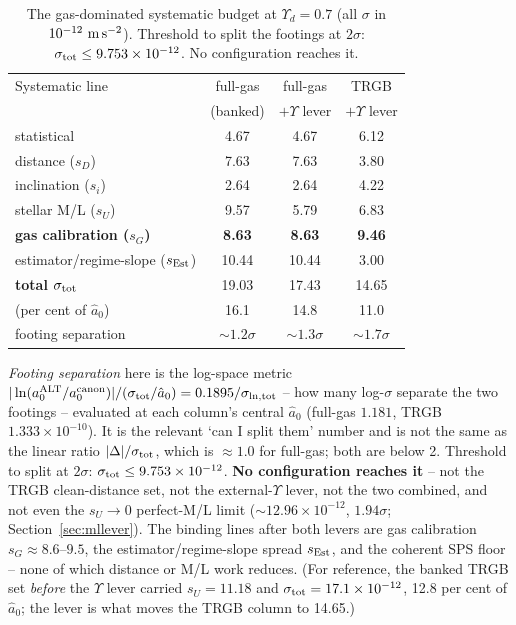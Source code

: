 \documentclass[fleqn,usenatbib]{mnras}
\begin{document}
\begin{table}
\centering
\caption{The gas-dominated systematic budget at $\Upsilon_d=0.7$ (all $\sigma$ in $10^{-12}\ {\rm m\,s^{-2}}$). Threshold to split the footings at $2\sigma$: $\sigma_{\rm tot}\le9.753\times10^{-12}$. No configuration reaches it.}
\label{tab:budget}
\setlength{\tabcolsep}{3.5pt}
\begin{tabular}{lccc}
\hline
Systematic line & full-gas & full-gas & TRGB \\
 & (banked) & $+\Upsilon$ lever & $+\Upsilon$ lever \\
\hline
statistical & 4.67 & 4.67 & 6.12 \\
distance ($s_D$) & 7.63 & 7.63 & 3.80 \\
inclination ($s_i$) & 2.64 & 2.64 & 4.22 \\
stellar M/L ($s_U$) & 9.57 & 5.79 & 6.83 \\
\textbf{gas calibration ($s_G$)} & \textbf{8.63} & \textbf{8.63} & \textbf{9.46} \\
estimator/regime-slope ($s_{\rm Est}$) & 10.44 & 10.44 & 3.00 \\
\hline
\textbf{total $\sigma_{\rm tot}$} & 19.03 & 17.43 & 14.65 \\
(per cent of $\hat a_0$) & 16.1 & 14.8 & 11.0 \\
footing separation & ${\sim}1.2\sigma$ & ${\sim}1.3\sigma$ & ${\sim}1.7\sigma$ \\
\hline
\end{tabular}
\end{table}

\emph{Footing separation} here is the log-space metric $|\ln(a_0^{\rm ALT}/a_0^{\rm canon})|/(\sigma_{\rm tot}/\hat a_0)=0.1895/\sigma_{\ln,\rm tot}$ -- how many log-$\sigma$ separate the two footings -- evaluated at each column's central $\hat a_0$ (full-gas $1.181$, TRGB $1.333\times10^{-10}$). It is the relevant `can I split them' number and is not the same as the linear ratio $|\Delta|/\sigma_{\rm tot}$, which is $\approx1.0$ for full-gas; both are below 2. Threshold to split at $2\sigma$: $\sigma_{\rm tot}\le9.753\times10^{-12}$. \textbf{No configuration reaches it} -- not the TRGB clean-distance set, not the external-$\Upsilon$ lever, not the two combined, and not even the $s_U\to0$ perfect-M/L limit (${\sim}12.96\times10^{-12}$, $1.94\sigma$; Section~\ref{sec:mllever}). The binding lines after both levers are gas calibration $s_G\approx8.6$--$9.5$, the estimator/regime-slope spread $s_{\rm Est}$, and the coherent SPS floor -- none of which distance or M/L work reduces. (For reference, the banked TRGB set \emph{before} the $\Upsilon$ lever carried $s_U=11.18$ and $\sigma_{\rm tot}=17.1\times10^{-12}$, 12.8 per cent of $\hat a_0$; the lever is what moves the TRGB column to 14.65.)
\end{document}

